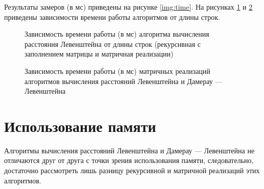 Результаты замеров (в мс) приведены на рисунке \ref{img:time}.
На рисунках \ref{plt:time_levenshtein} и \ref{plt:time_dl} приведены зависимости времени работы алгоритмов от длины строк.


\begin{figure}[h]
	\centering
	\captionsetup{justification=centering}
	\caption{Зависимость времени работы (в мс) алгоритма вычисления расстояния Левенштейна от длины строк (рекурсивная с заполнением матрицы и матричная реализации)}
	\label{plt:time_levenshtein}
\end{figure}

\begin{figure}
	\centering
	\captionsetup{justification=centering}
	\caption{Зависимость времени работы (в мс) матричных реализаций алгоритмов вычисления расстояний Левенштейна и Дамерау — Левенштейна}
	\label{plt:time_dl}
\end{figure}

\section{Использование памяти}

Алгоритмы вычисления расстояний Левенштейна и Дамерау — Левенштейна не отличаются друг от друга с точки зрения использования памяти, следовательно, достаточно рассмотреть лишь разницу рекурсивной и матричной реализаций этих алгоритмов.

